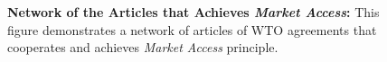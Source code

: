 

\begin{figure}
    \centering{
      
    }
    \caption{{\bf Network of the Articles that Achieves \textit{Market Access}:} 
    This figure demonstrates a network of articles of WTO agreements
    that cooperates and achieves \textit{Market Access} principle.
    }
    \label{fig:market-aceess_directed}
  \end{figure}
  
% 

% 



